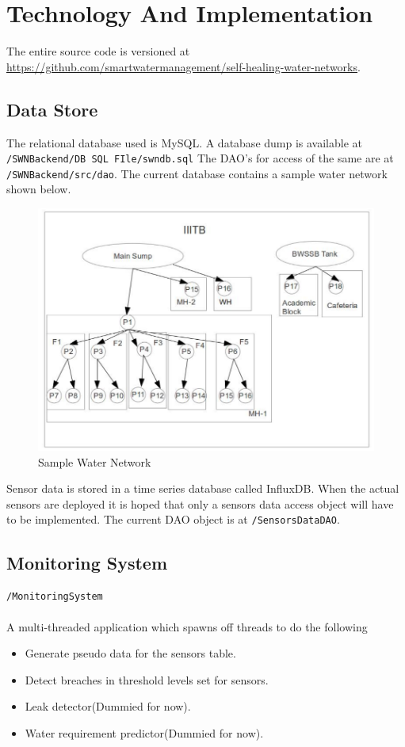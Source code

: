 \documentclass[11pt]{report} %
\begin{document}

\chapter{Technology And Implementation}
The entire source code is versioned at \\ \url {https://github.com/smartwatermanagement/self-healing-water-networks}.

\section{Data Store}
The relational database used is MySQL. A database dump is available at \texttt{/SWNBackend/DB SQL FIle/swndb.sql}
The DAO's for access of the same are at \texttt{/SWNBackend/src/dao}.
The current database contains a sample water network shown below.
\begin{figure}[h!]
\caption{Sample Water Network}
\centering
\includegraphics[scale=0.4]{samplenetworkcut.png}
\end{figure}

Sensor data is stored in a time series database called InfluxDB. When the actual sensors are deployed it is hoped that only a sensors data access object will have to be implemented. The current DAO object is at \texttt{/SensorsDataDAO}.

\section{Monitoring System}
\texttt{/MonitoringSystem}\\
\\
A multi-threaded application which spawns off threads to do the following
\begin{itemize}
\item Generate pseudo data for the sensors table.
\item Detect breaches in threshold levels set for sensors.
\item Leak detector(Dummied for now).
\item Water requirement predictor(Dummied for now).
\end{itemize}
\end{document}

